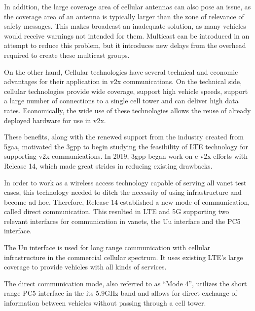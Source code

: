 In addition, the large coverage area of cellular antennas can also pose an issue, as the coverage area of an antenna is typically larger than the zone of relevance of safety messages. This makes broadcast an inadequate solution, as many vehicles would receive warnings not intended for them. Multicast can be introduced in an attempt to reduce this problem, but it introduces new delays from the overhead required to create these multicast groups\cite{gyawali_challenges_2021}.

On the other hand, Cellular technologies have several technical and economic advantages for their application in \gls{v2x} communications. On the technical side, cellular technologies provide wide coverage, support high vehicle speeds, support a large number of connections to a single cell tower and can deliver high data rates. Economically, the wide use of these technologies allows the reuse of already deployed hardware for use in \gls{v2x}\cite{gyawali_challenges_2021}.

These benefits, along with the renewed support from the industry created from \gls{5gaa}, motivated the \gls{3gpp} to begin studying the feasibility of LTE technology for supporting \gls{v2x} communications\cite{gyawali_challenges_2021}. In 2019, \gls{3gpp} began work on \gls{c-v2x} efforts with Release 14, which made great strides in reducing existing drawbacks.

In order to work as a wireless access technology capable of serving all \gls{vanet} test cases, this technology needed to ditch the necessity of using infrastructure and become ad hoc. Therefore, Release 14 established a new mode of communication, called direct communication.\cite{weber_c-v2x_2019} This resulted in LTE and 5G supporting two relevant interfaces for communication in \glspl{vanet}, the Uu interface and the PC5 interface.

The Uu interface is used for long range communication with cellular infrastructure in the commercial cellular spectrum. It uses existing LTE's large coverage to provide vehicles with all kinds of services\cite{weber_c-v2x_2019}.

The direct communication mode, also referred to as “Mode 4”, utilizes the short range PC5 interface in the \gls{its} 5.9GHz band and allows for direct exchange of information between vehicles without passing through a cell tower.


